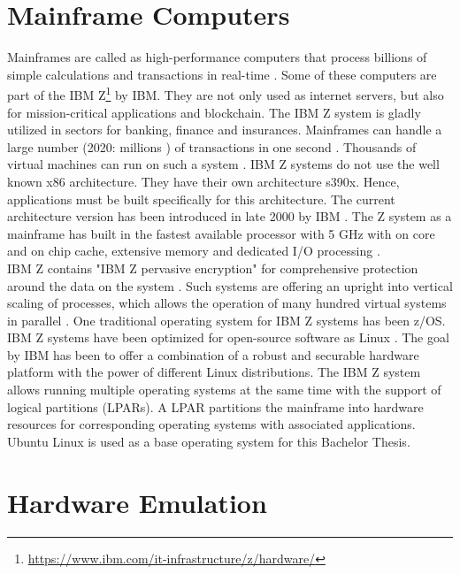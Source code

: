 \section{Mainframe Computers}

Mainframes are called as high-performance computers that process billions of simple calculations and transactions in real-time \cite{IBM}. Some of these computers are part of the IBM Z\footnote{\url{https://www.ibm.com/it-infrastructure/z/hardware/}} by IBM. They are not only used as internet servers, but also for mission-critical applications and blockchain. 
The IBM Z system is gladly utilized in sectors for banking, finance and insurances.
Mainframes can handle a large number (2020: millions \cite{IBM2}) of transactions in one second \cite[~p.56]{Tanenbaum2014}. 
Thousands of virtual machines can run on such a system \cite{OpenMainframeProject}. \gls{IBM Z systems} do not use the well known x86 architecture. 
They have their own architecture s390x. Hence, applications must be built specifically for this architecture. 
The current architecture version has been introduced in late 2000 by IBM \cite[~p.15]{Block2019}. The Z system as a mainframe has built in the fastest available processor with 5 GHz with on core and on chip cache, extensive memory and dedicated I/O processing \cite{OpenMainframeProject}.
\\
IBM Z contains "IBM Z pervasive encryption" for comprehensive protection around the data on the system \cite[~p.4]{Lascu2020}. Such systems are offering an upright into vertical \gls{scaling} of processes, which allows the operation of many hundred virtual systems in parallel \cite[~p.13]{Tschoeke2009}. One traditional operating system for IBM Z systems has been z/OS. 
IBM Z systems have been optimized for open-source software as Linux \cite[~p.8]{Lascu2020}. The goal by IBM has been to offer a combination of a robust and securable hardware platform with the power of different Linux distributions. 
The IBM Z system allows running multiple operating systems at the same time with the support of logical partitions (LPARs).
A \gls{LPAR} partitions the mainframe into hardware resources for corresponding operating systems with associated applications. \\
Ubuntu Linux is used as a base operating system for this Bachelor Thesis.


\section{Hardware Emulation}

